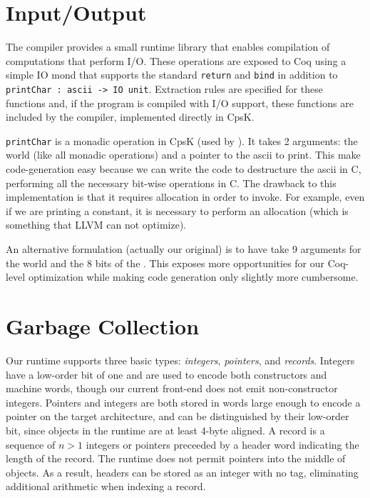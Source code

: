 \documentclass{article}
\begin{document}
\section{Input/Output}
\label{sec:io}

The compiler provides a small runtime library that enables compilation of computations that perform I/O. These operations are exposed to Coq using a simple IO mond that supports the standard \verb!return! and \lstinline!bind! in addition to \lstinline!printChar : ascii -> IO unit!. Extraction rules are specified for these functions and, if the program is compiled with I/O support, these functions are included by the compiler, implemented directly in CpsK.

\lstinline!printChar! is a monadic operation in CpsK (used by ). It takes 2 arguments: the world (like all monadic operations) and a pointer to the ascii to print. This make code-generation easy because we can write the code to destructure the ascii in C, performing all the necessary bit-wise operations in C. The drawback to this implementation is that it requires allocation in order to invoke. For example, even if we are printing a constant, it is necessary to perform an allocation (which is something that LLVM can not optimize). 

An alternative formulation (actually our original) is to have  take 9 arguments for the world and the 8 bits of the . This exposes more opportunities for our Coq-level optimization while making code generation only slightly more cumbersome. 

\section{Garbage Collection}
\label{sec:gc}

Our runtime supports three basic types: \emph{integers}, \emph{pointers}, and \emph{records}. Integers have a low-order bit of one and are used to encode both constructors and machine words, though our current front-end does not emit non-constructor integers. Pointers and integers are both stored in words large enough to encode a pointer on the target architecture, and can be distinguished by their low-order bit, since objects in the runtime are at least 4-byte aligned. A record is a sequence of $n > 1$ integers or pointers preceeded by a header word indicating the length of the record. The runtime does not permit pointers into the middle of objects. As a result, headers can be stored as an integer with no tag, eliminating additional arithmetic when indexing a record.
\end{document}
